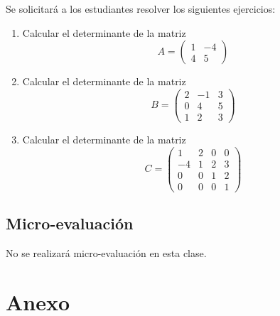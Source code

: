 \documentclass[a4,11pt]{aleph-notas}
\begin{document}
Se solicitará a los estudiantes resolver los siguientes ejercicios:
\begin{enumerate}
    \item Calcular el determinante de la matriz 
    \[
        A = \begin{pmatrix}
            1 & -4\\
            4 & 5 \
        \end{pmatrix}
    \] 
    \item Calcular el determinante de la matriz
    \[
        B = \begin{pmatrix}
            2 & -1 & 3\\
            0 & 4 & 5\\
            1 & 2 & 3
        \end{pmatrix}
    \]
    \item Calcular el determinante de la matriz
    \[
        C = \begin{pmatrix}
            1 & 2 & 0 & 0\\
            -4 & 1 & 2 & 3\\
            0 & 0 & 1 & 2\\
            0 & 0 & 0 & 1
        \end{pmatrix}
    \]
\end{enumerate}

\subsection{Micro-evaluación}

No se realizará micro-evaluación en esta clase.


\section*{Anexo}
\end{document}
